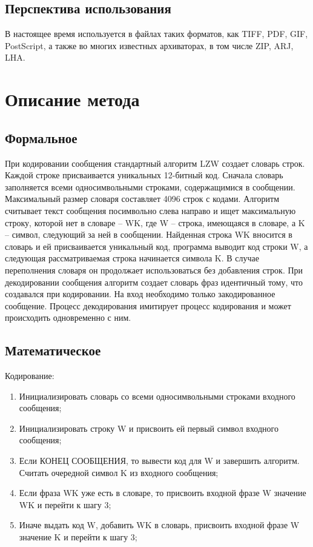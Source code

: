 \documentclass{article}
\begin{document}
\subsection{Перспектива использования}

В настоящее время используется в файлах таких форматов, как TIFF, PDF, GIF, PostScript, а также во многих известных архиваторах, в том числе ZIP, ARJ, LHA.

\section{Описание метода}

\subsection{Формальное}

При кодировании сообщения стандартный алгоритм LZW создает словарь строк. Каждой строке присваивается уникальных 12-битный код. Сначала словарь заполняется всеми односимвольными строками, содержащимися в сообщении. Максимальный размер словаря составляет 4096 строк с кодами. Алгоритм считывает текст сообщения посимвольно слева направо и ищет максимальную строку, которой нет в словаре – WK, где W – строка, имеющаяся в словаре, а K – символ, следующий за ней в сообщении. Найденная строка WK вносится в словарь и ей присваивается уникальный код, программа выводит код строки W, а следующая рассматриваемая строка начинается символа K. В случае переполнения словаря он продолжает использоваться без добавления строк.
При декодировании сообщения алгоритм создает словарь фраз идентичный тому, что создавался при кодировании. На вход необходимо только закодированное сообщение. Процесс декодирования имитирует процесс кодирования и может происходить одновременно с ним.

\subsection{Математическое}

Кодирование:
\begin{enumerate}
\item Инициализировать словарь со всеми односимвольными строками входного сообщения;
\item Инициализировать строку W и присвоить ей первый символ входного сообщения;
\item Если КОНЕЦ СООБЩЕНИЯ, то вывести код для W и завершить алгоритм.
Считать очередной символ K из входного сообщения;
\item Если фраза WK уже есть в словаре, то присвоить входной фразе W значение WK и перейти к шагу 3;
\item Иначе выдать код W, добавить WK в словарь, присвоить входной фразе W значение K и перейти к шагу 3;
\end{enumerate}
\end{document}
